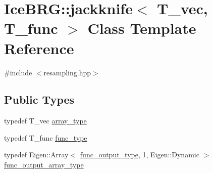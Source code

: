 \hypertarget{classIceBRG_1_1jackknife}{}\section{Ice\+B\+R\+G\+:\+:jackknife$<$ T\+\_\+vec, T\+\_\+func $>$ Class Template Reference}
\label{classIceBRG_1_1jackknife}


{\ttfamily \#include $<$resampling.\+hpp$>$}

\subsection*{Public Types}
\begin{DoxyCompactItemize}
\item 
typedef T\+\_\+vec \hyperlink{classIceBRG_1_1jackknife_ad2892a939f8fc89723db89ac837317be}{array\+\_\+type}
\item 
typedef T\+\_\+func \hyperlink{classIceBRG_1_1jackknife_a3399a8fe403193ec9f56ef991dcbfce2}{func\+\_\+type}
\item 
typedef Eigen\+::\+Array$<$ \hyperlink{classIceBRG_1_1jackknife_a1b24a65a9543f5708c9fc895620c031b}{func\+\_\+output\+\_\+type}, 1, Eigen\+::\+Dynamic $>$ \hyperlink{classIceBRG_1_1jackknife_a6eb000e6a82a691bfab8ca344e17186a}{func\+\_\+output\+\_\+array\+\_\+type}
\end{DoxyCompactItemize}
